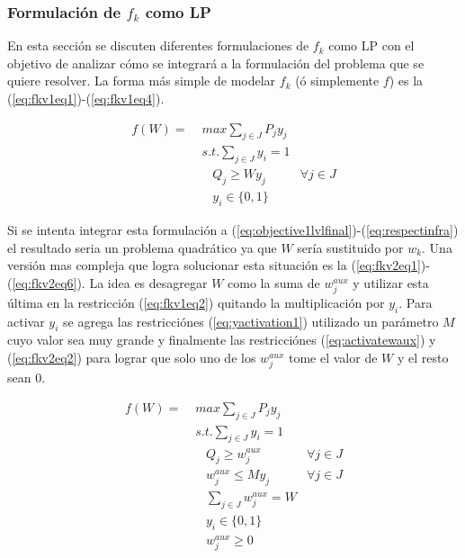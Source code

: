 \documentclass{article}
\begin{document}
  \subsubsection*{Formulación de $f_k$ como LP}

  En esta sección se discuten diferentes formulaciones de $f_k$ como LP con el objetivo de analizar cómo se integrará a la formulación del problema que se quiere resolver. La forma más simple de modelar $f_k$ (ó simplemente $f$) es la (\ref{eq:fkv1eq1})-(\ref{eq:fkv1eq4}).

  \begin{align}
    f(W) =\; & max \sum_{j \in J} P_j y_j    & \label{eq:fkv1eq1}\\
             & s.t. \sum_{j \in J} y_i = 1   & \label{eq:fkv1eq2} \\
             & \;\;\; Q_j \geq W y_j         & \forall j \in J \\
             & \;\;\; y_i \in \{0,1\}        & \label{eq:fkv1eq4}
  \end{align}

  Si se intenta integrar esta formulación a (\ref{eq:objective1lvlfinal})-(\ref{eq:respectinfra}) el resultado seria un problema quadrático ya que $W$ sería sustituido por $w_k$. Una versión mas compleja que logra solucionar esta situación es la (\ref{eq:fkv2eq1})-(\ref{eq:fkv2eq6}). La idea es desagregar $W$ como la suma de $w^{aux}_j$ y utilizar esta última en la restricción (\ref{eq:fkv1eq2}) quitando la multiplicación por $y_i$. Para activar $y_i$ se agrega las restricciónes (\ref{eq:yactivation1}) utilizado un parámetro $M$ cuyo valor sea muy grande y finalmente las restricciónes (\ref{eq:activatewaux}) y (\ref{eq:fkv2eq2}) para lograr que solo uno de los $w^{aux}_j$ tome el valor de $W$ y el resto sean 0.

  \begin{align}
    f(W) =\; & max \sum_{j \in J} P_j y_j             & \label{eq:fkv2eq1}\\
             & s.t. \sum_{j \in J} y_i = 1            & \label{eq:fkv2eq2}\\
             & \;\;\; Q_j \geq w^{aux}_j              & \forall j \in J \label{eq:implfkoriginalineq} \\
             & \;\;\; w^{aux}_j \leq M y_j            & \forall j \in J \label{eq:yactivation1} \\
             & \;\;\; \sum_{j \in J} w^{aux}_j = W    & \label{eq:activatewaux} \\
             & \;\;\; y_i \in \{0,1\}                 & \\
             & \;\;\; w^{aux}_j \geq 0                & \label{eq:fkv2eq6}
  \end{align}
\end{document}
